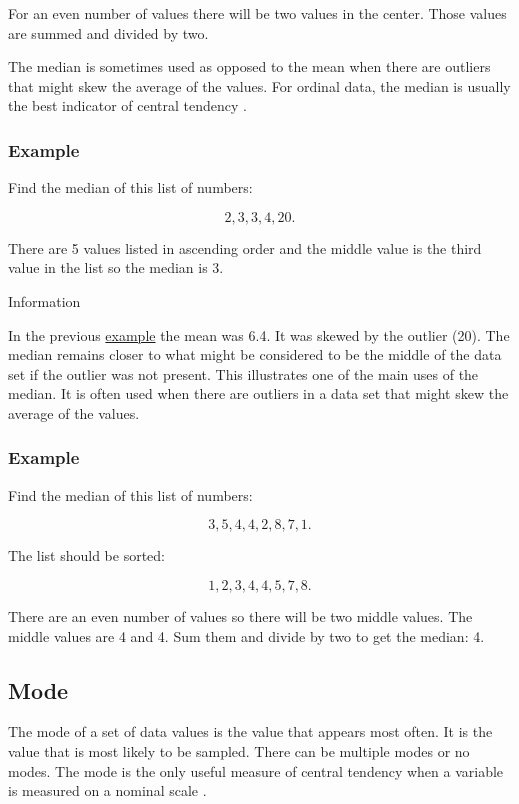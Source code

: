 \documentclass[
]{book}
\begin{document}
For an even number of values there will be two values in the center. Those values are summed and divided by two.

The median is sometimes used as opposed to the mean when there are outliers that might skew the average of the values. For ordinal data, the median is usually the best indicator of central tendency \citep{mchugh3}.

\hypertarget{example-1}{%
\subsubsection{Example}\label{example-1}}

Find the median of this list of numbers:

\[ 2, 3, 3, 4, 20.\]

There are 5 values listed in ascending order and the middle value is the third value in the list so the median is 3.

Information

In the previous \protect\hyperlink{firstexamp}{example} the mean was 6.4. It was skewed by the outlier (20). The median remains closer to what might be considered to be the middle of the data set if the outlier was not present. This illustrates one of the main uses of the median. It is often used when there are outliers in a data set that might skew the average of the values.

\hypertarget{example-2}{%
\subsubsection{Example}\label{example-2}}

Find the median of this list of numbers:

\[ 3, 5, 4, 4, 2, 8, 7, 1.\]

The list should be sorted:

\[ 1, 2, 3, 4, 4, 5, 7, 8. \]

There are an even number of values so there will be two middle values. The middle values are 4 and 4. Sum them and divide by two to get the median: 4.

\hypertarget{mode}{%
\subsection{Mode}\label{mode}}

The mode of a set of data values is the value that appears most often. It is the value that is most likely to be sampled. There can be multiple modes or no modes. The mode is the only useful measure of central tendency when a variable is measured on a nominal scale \citep{mchugh3}.
\end{document}
